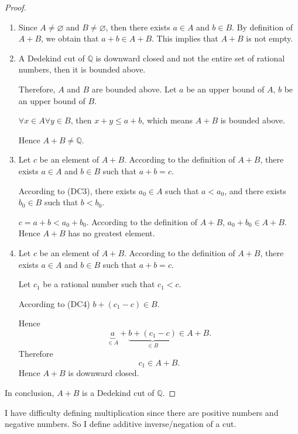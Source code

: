 \begin{proof}
    \begin{enumerate}[label={(\roman*)},itemsep=0pt]
        \item Since $A\ne\varnothing$ and $B\ne\varnothing$, then there exists $a\in A$ and $b\in B$. By definition of $A + B$, we obtain that $a + b \in A + B$. This implies that $A + B$ is not empty.
        \item A Dedekind cut of $\mathbb{Q}$ is downward closed and not the entire set of rational numbers, then it is bounded above.

              Therefore, $A$ and $B$ are bounded above. Let $a$ be an upper bound of $A$, $b$ be an upper bound of $B$.

              $\forall x\in A\forall y\in B$, then $x + y \le a + b$, which means $A + B$ is bounded above.

              Hence $A + B\ne\mathbb{Q}$.
        \item Let $c$ be an element of $A + B$. According to the definition of $A + B$, there exists $a\in A$ and $b\in B$ such that $a + b = c$.

              According to (DC3), there exists $a_{0}\in A$ such that $a < a_{0}$, and there exists $b_{0}\in B$ such that $b < b_{0}$.

              $c = a + b < a_{0} + b_{0}$. According to the definition of $A + B$, $a_{0} + b_{0} \in A + B$. Hence $A + B$ has no greatest element.
        \item Let $c$ be an element of $A + B$. According to the definition of $A + B$, there exists $a\in A$ and $b\in B$ such that $a + b = c$.

              Let $c_{1}$ be a rational number such that $c_{1} < c$.

              According to (DC4) $b + (c_{1} - c)\in B$.

              Hence
              \[
                  \underbrace{a}_{\in A} + \underbrace{b + (c_{1} - c)}_{\in B} \in A + B.
              \]
              Therefore
              \[
                  c_{1} \in A + B.
              \]
              Hence $A + B$ is downward closed.
    \end{enumerate}
    In conclusion, $A + B$ is a Dedekind cut of $\mathbb{Q}$.
\end{proof}

I have difficulty defining multiplication since there are positive numbers and negative numbers. So I define additive inverse/negation of a cut.

